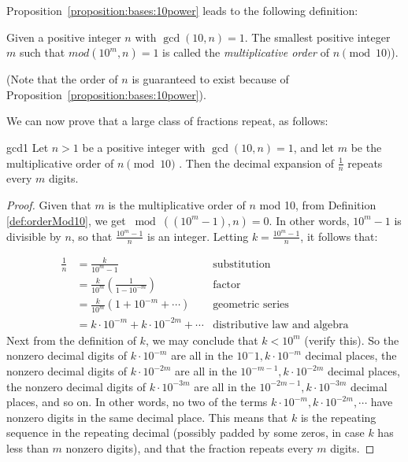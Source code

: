 Proposition~\ref{proposition:bases:10power} leads to the following definition:

\begin{defn}\label{def:orderMod10}
Given a positive integer $n$ with $\gcd(10,n)=1$. The smallest positive integer $m$ such that $mod(10^{m},n)=1$  is called the \textit{multiplicative order} of $n \pmod{10}$).\\
\noindent

(Note that the order of $n$ is guaranteed to exist because of Proposition~\ref{proposition:bases:10power}).
\end{defn}
\noindent

We can now prove that a large class of fractions  repeat, as follows:

\begin{prop}{gcd1}
Let $n>1$ be a positive integer with $\gcd(10,n)=1$, and let $m$ be the multiplicative order of $n \pmod{10}$ . Then the decimal expansion of $\frac{1}{n}$ repeats every $m$ digits.
\end{prop}

\begin{proof}
Given that $m$ is the multiplicative order of $n$ mod 10, from Definition \ref{def:orderMod10}, we get $\bmod((10^{m}-1),n)=0$. In other words, $10^{m}-1$ is divisible by $n$, so that $\frac{10^{m}-1}{n}$ is an integer. Letting $k=\frac{10^{m}-1}{n}$,  it follows that:

\begin{align*}
\frac{1}{n}&=\frac{k}{10^{m}-1} & \text{substitution}\\
&=\frac{k}{10^{m}}\left(\frac{1}{1-10^{-m}}\right) & \text{factor}\\
&=\frac{k}{10^{m}}\left(1+10^{-m}+\cdots\right) &\text{geometric series}\\
&=k \cdot 10^{-m}+ k \cdot 10^{-2m}+\cdots  &\text{distributive law and algebra}
\end{align*}
Next from the definition of $k$, we may conclude that $k < 10^m$ (verify this). So the nonzero decimal digits of $k\cdot 10^{-m}$ are all in the $10^-1, k\cdot 10^{-m}$ decimal places, the nonzero decimal digits of $k\cdot 10^{-2m}$ are all in the $10^{-m-1}, k\cdot 10^{-2m}$ decimal places, 
 the nonzero decimal digits of $k\cdot 10^{-3m}$ are all in the $10^{-2m-1}, k\cdot 10^{-3m}$ decimal places, and so on. In other words, no two of the terms $k \cdot 10^{-m},  k \cdot 10^{-2m}, \cdots$ have nonzero digits in the same decimal place.
This means that $k$ is the repeating sequence in the repeating decimal (possibly padded by some zeros, in case $k$ has less than $m$ nonzero digits), and that the fraction repeats every $m$ digits.
\end{proof}

